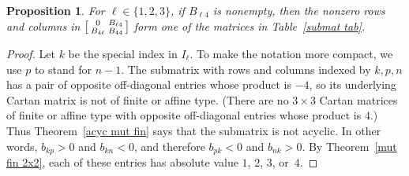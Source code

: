 \documentclass{amsart}
\newtheorem{proposition}{Proposition}[section]
\theoremstyle{definition}
\theoremstyle{remark}
\numberwithin{equation}{section}
\newcommand{\set}[1]{{\lbrace #1 \rbrace}}
\newcommand{\0}{{\mathbf{0}}}
\begin{document}
\begin{proposition}\label{3x3 submat}
For $\ell\in\set{1,2,3}$, if $B_{\ell4}$ is nonempty, then the nonzero rows and columns in $\begin{bsmallmatrix} 0 & B_{\ell4} \\ B_{4\ell} & B_{44} \end{bsmallmatrix}$ form one of the matrices in Table~\ref{submat tab}.
\end{proposition}
\begin{proof}
Let $k$ be the special index in $I_\ell$.
To make the notation more compact, we use $p$ to stand for $n-1$.
The submatrix with rows and columns indexed by $k,p,n$ has a pair of opposite off-diagonal entries whose product is $-4$, so its underlying Cartan matrix is not of finite or affine type.
(There are no $3\times3$ Cartan matrices of finite or affine type with opposite off-diagonal entries whose product is $4$.)
Thus Theorem~\ref{acyc mut fin} says that the submatrix is not acyclic.
In other words, $b_{kp}>0$ and $b_{kn}<0$, and therefore $b_{pk}<0$ and $b_{nk}>0$.
By Theorem~\ref{mut fin 2x2}, each of these entries has absolute value $1$, $2$, $3$, or~$4$.


\end{proof}
\end{document}
